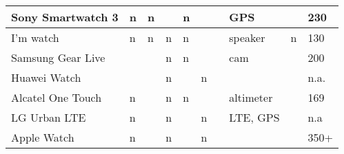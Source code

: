 \begin{table}[h]
\begin{tabular}{|l|l|l|l|l|l|l|l|l|l|}
\cellcolor[HTML]{F8FF00}Sony Smartwatch 3 & \cellcolor[HTML]{FE0000}n & \cellcolor[HTML]{FE0000}n & \cellcolor[HTML]{32CB00}  & \cellcolor[HTML]{FE0000}n & \cellcolor[HTML]{32CB00}  & \cellcolor[HTML]{32CB00} & GPS                 & \cellcolor[HTML]{32CB00}  & 230                         \\ \hline
I’m watch                                 & \cellcolor[HTML]{FE0000}n & \cellcolor[HTML]{FE0000}n & \cellcolor[HTML]{FE0000}n & \cellcolor[HTML]{FE0000}n & \cellcolor[HTML]{32CB00}  & \cellcolor[HTML]{32CB00} & speaker             & \cellcolor[HTML]{FE0000}n & 130                         \\ \hline
Samsung Gear Live                         & \cellcolor[HTML]{32CB00}  & \cellcolor[HTML]{32CB00}  & \cellcolor[HTML]{FE0000}n & \cellcolor[HTML]{FE0000}n & \cellcolor[HTML]{32CB00}  & \cellcolor[HTML]{32CB00} & cam                 & \cellcolor[HTML]{32CB00}  & 200                         \\ \hline
Huawei Watch                              & \cellcolor[HTML]{32CB00}  & \cellcolor[HTML]{32CB00}  & \cellcolor[HTML]{FE0000}n & \cellcolor[HTML]{32CB00}  & \cellcolor[HTML]{FE0000}n & \cellcolor[HTML]{32CB00} &                     & \cellcolor[HTML]{32CB00}  & n.a.                        \\ \hline
Alcatel One Touch                         & \cellcolor[HTML]{FE0000}n & \cellcolor[HTML]{32CB00}  & \cellcolor[HTML]{FE0000}n & \cellcolor[HTML]{FE0000}n & \cellcolor[HTML]{32CB00}  & \cellcolor[HTML]{32CB00} & altimeter           & \cellcolor[HTML]{32CB00}  & 169                         \\ \hline
LG Urban LTE                              & \cellcolor[HTML]{FE0000}n & \cellcolor[HTML]{32CB00}  & \cellcolor[HTML]{FE0000}n & \cellcolor[HTML]{32CB00}  & \cellcolor[HTML]{FE0000}n & \cellcolor[HTML]{32CB00} & LTE, GPS            & \cellcolor[HTML]{32CB00}  & \cellcolor[HTML]{FFFFFF}n.a \\ \hline
\cellcolor[HTML]{FCFF2F}Apple Watch       & \cellcolor[HTML]{FE0000}n & \cellcolor[HTML]{32CB00}  & \cellcolor[HTML]{FE0000}n & \cellcolor[HTML]{32CB00}  & \cellcolor[HTML]{FE0000}n & \cellcolor[HTML]{32CB00} &                     & \cellcolor[HTML]{32CB00}  & 350+                        \\ \hline
\end{tabular}
\end{table}
\pagebreak